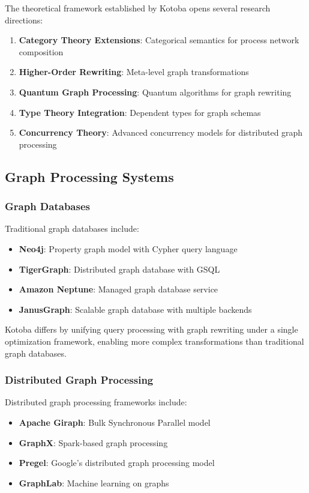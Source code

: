 \documentclass[11pt,a4paper]{article}
\begin{document}
The theoretical framework established by Kotoba opens several research directions:

\begin{enumerate}
\item \textbf{Category Theory Extensions}: Categorical semantics for process network composition
\item \textbf{Higher-Order Rewriting}: Meta-level graph transformations
\item \textbf{Quantum Graph Processing}: Quantum algorithms for graph rewriting
\item \textbf{Type Theory Integration}: Dependent types for graph schemas
\item \textbf{Concurrency Theory}: Advanced concurrency models for distributed graph processing
\end{enumerate}

\subsection{Graph Processing Systems}
\label{subsec:graph_systems}

\subsubsection{Graph Databases}
\label{subsubsec:graph_databases}

Traditional graph databases include:
\begin{itemize}
\item \textbf{Neo4j}: Property graph model with Cypher query language
\item \textbf{TigerGraph}: Distributed graph database with GSQL
\item \textbf{Amazon Neptune}: Managed graph database service
\item \textbf{JanusGraph}: Scalable graph database with multiple backends
\end{itemize}

Kotoba differs by unifying query processing with graph rewriting under a single optimization framework, enabling more complex transformations than traditional graph databases.

\subsubsection{Distributed Graph Processing}
\label{subsubsec:distributed_graph}

Distributed graph processing frameworks include:
\begin{itemize}
\item \textbf{Apache Giraph}: Bulk Synchronous Parallel model
\item \textbf{GraphX}: Spark-based graph processing
\item \textbf{Pregel}: Google's distributed graph processing model
\item \textbf{GraphLab}: Machine learning on graphs
\end{itemize}
\end{document}
